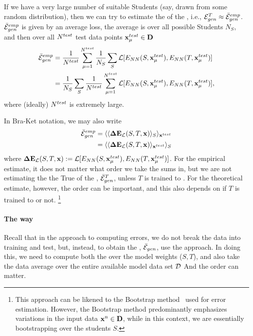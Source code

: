 If we have a very large number of suitable Students
(say, drawn from some random distribution), then we can try to estimate the 
\AverageGeneralizationError of the \Teacher, i.e., ${\mathcal{E}}_{gen}^{T}\approx\bar{\mathcal{E}}^{emp}_{gen}$.
$\bar{\mathcal{E}}^{emp}_{gen}$ is given by an average loss, the average is 
over all possible Students $N_S$,  and then  over all  $N^{test}$ test data points $\mathbf{x}_{\mu}^{test}\in\mathbf{D}$ 
\begin{align}
  \bar{\mathcal{E}}^{emp}_{gen}
  &=
  \frac{1}{N^{test}}\sum_{\mu=1}^{N^{test}}
  \frac{1}{N_S}\sum_{S}
  \mathcal{L}[E_{NN}(S,\mathbf{x}_{\mu}^{test}),E_{NN}(T,\mathbf{x}_{\mu}^{test})]  \\ \nonumber
    &=
  \frac{1}{N_S}\sum_{S}
    \frac{1}{N^{test}}\sum_{\mu=1}^{N^{test}}
    \mathcal{L}[E_{NN}(S,\mathbf{x}_{\mu}^{test}),E_{NN}(T,\mathbf{x}_{\mu}^{test})] ,
\label{eqn:emp_gen_error}
\end{align}
where (ideally) $N^{test}$ is extremely large.

In Bra-Ket notation, we may also write
\begin{align}
  \bar{\mathcal{E}}^{emp}_{gen}
  &= \langle \langle \mathbf{\Delta {E}}_{\mathcal{L}}(S,T,\mathbf{x}) \rangle_{S} \rangle_{\mathbf{x}^{test}}\\ \nonumber
  &= \langle \langle \mathbf{\Delta {E}}_{\mathcal{L}}(S,T,\mathbf{x}) \rangle_{\mathbf{x}^{test}} \rangle_{S}
\end{align}
where $\mathbf{\Delta {E}}_{\mathcal{L}}(S,T,\mathbf{x}):=\mathcal{L}[E_{NN}(S,\mathbf{x}_{\mu}^{test}),E_{NN}(T,\mathbf{x}_{\mu}^{test})]$.
For the empirical estimate, it does not matter what order we take the sums in,
but we are not estimating the
the True \AverageGeneralizationError  of the \Teacher, $\bar{\mathcal{E}}_{gen}^{T}$,
unless $T$ is trained to \Interpolation.
For the theoretical estimate, however, the order can be important, and this also depends on
if $T$ is trained to \Interpolation or not.
\footnote{This approach can be likened to the Bootstrap method~\cite{efron1993bootstrap} used for error estimation.  However, the Bootstrap method predominantly emphasizes variations in the input data $\mathbf{x}^{n}\in\mathbf{D}$, while in this context, we are essentially bootstrapping over the students $S$.}


\paragraph{The \STATMECH way}
Recall that in the \STATMECH approach to computing errors, we do not break the data into
training and test, but, instead, to obtain the \AverageGeneralizationError, $\bar{\mathcal{E}}_{gen}$, use
the \GeneratingFunction approach. In doing this, we need to compute both the \ThermalAverage
over the model weights ($S,T$), and also take the data average over the entire available model data set $\mathcal{D}$
And the order can matter.

